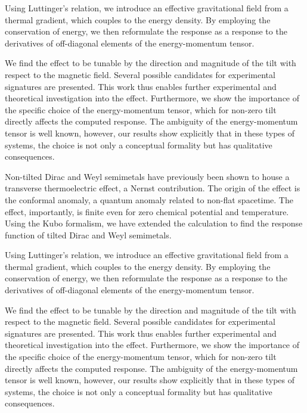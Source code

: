 Using Luttinger's relation, we introduce an effective gravitational field from a thermal gradient, which couples to the energy density.
By employing the conservation of energy, we then reformulate the response as a response to the derivatives of off-diagonal elements of the energy-momentum tensor.

We find the effect to be tunable by the direction and magnitude of the tilt with respect to the magnetic field.
Several possible candidates for experimental signatures are presented.
This work thus enables further experimental and theoretical investigation into the effect.
Furthermore, we show the importance of the specific choice of the energy-momentum tensor, which for non-zero tilt directly affects the computed response.
The ambiguity of the energy-momentum tensor is well known, however, our results show explicitly that in these types of systems, the choice is not only a conceptual formality but has qualitative consequences.


Non-tilted Dirac and Weyl semimetals have previously been shown to house a transverse thermoelectric effect, a Nernst contribution.
The origin of the effect is the conformal anomaly, a quantum anomaly related to non-flat spacetime.
The effect, importantly, is finite even for zero chemical potential and temperature.
Using the Kubo formalism, we have extended the calculation to find the response function of tilted Dirac and Weyl semimetals.

Using Luttinger's relation, we introduce an effective gravitational field from a thermal gradient, which couples to the energy density.
By employing the conservation of energy, we then reformulate the response as a response to the derivatives of off-diagonal elements of the energy-momentum tensor.

We find the effect to be tunable by the direction and magnitude of the tilt with respect to the magnetic field.
Several possible candidates for experimental signatures are presented.
This work thus enables further experimental and theoretical investigation into the effect.
Furthermore, we show the importance of the specific choice of the energy-momentum tensor, which for non-zero tilt directly affects the computed response.
The ambiguity of the energy-momentum tensor is well known, however, our results show explicitly that in these types of systems, the choice is not only a conceptual formality but has qualitative consequences.

